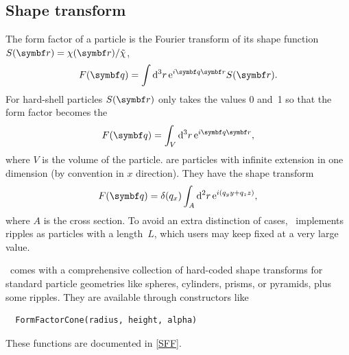 \subsection{Shape transform}

The form factor %
of a particle is the Fourier transform
of its shape function $S(\r)=\chi(\r)/\tilde\chi$,
%
%
%
\begin{equation}
  F(\q)=\int {\rm d}^3r\, {\rm e}^{i\q\r} S(\r).
\end{equation}
For hard-shell particles %
$S(\r)$ only takes the values 0 and~1
so that the form factor becomes
the 
%
\begin{equation}\label{EFFhardshell}
  F(\q)=\int_V {\rm d}^3r\, {\rm e}^{i\q\r},
\end{equation}
where $V$ is the volume of the particle.
%
%
 are particles with infinite extension in one dimension
(by convention in $x$ direction).
They have the shape transform
\begin{equation}\label{EFFripple}
  F(\q)=\delta(q_x)\int_A {\rm d}^2r\, {\rm e}^{i(q_y y + q_z z)},
\end{equation}
where $A$ is the cross section.
To avoid an extra distinction of cases,
\BornAgain\ implements ripples as particles with a  length~$L$,
which users may keep fixed at a very large value.

\BornAgain\ comes with a comprehensive collection of hard-coded
shape transforms for standard particle geometries like
spheres, cylinders, prisms, or pyramids,
plus some ripples.
They are available through constructors like
\begin{lstlisting}
  FormFactorCone(radius, height, alpha)
\end{lstlisting}
These functions are documented in \cref{SFF}.

%
%
%

